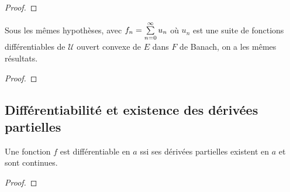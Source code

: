 \begin{proof}
	
\end{proof}

\begin{corollary}
	Sous les mêmes hypothèses, avec $f_{n} = \sum\limits_{n = 0}^{\infty} u_{n}$ où
	$u_{n}$ est une suite de fonctions différentiables de $\mathcal{U}$ ouvert
	convexe de $E$ dans $F$ de Banach, on a les mêmes résultats.
\end{corollary}

\begin{proof}
	
\end{proof}

\subsection{Différentiabilité et existence des dérivées partielles}

\begin{theorem}
\label{theorem_partial_derivative_existence}
	Une fonction $f$ est différentiable en $a$ ssi ses dérivées partielles
	existent en $a$ et sont continues.
\end{theorem}

\begin{proof}
	
\end{proof}
